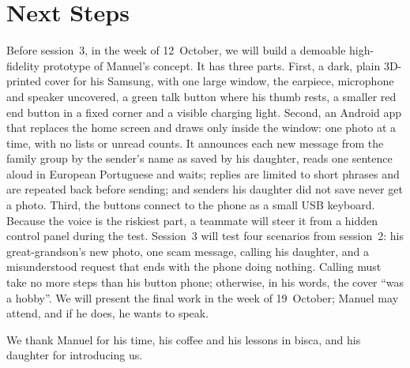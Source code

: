 \documentclass[acmtog,nonacm]{acmart}
\begin{document}
\section{Next Steps}\label{sec:next}
Before session~3, in the week of 12~October, we will build a demoable high-fidelity prototype of Manuel's concept. It has three parts. First, a dark, plain 3D-printed cover for his Samsung, with one large window, the earpiece, microphone and speaker uncovered, a green talk button where his thumb rests, a smaller red end button in a fixed corner and a visible charging light. Second, an Android app that replaces the home screen and draws only inside the window: one photo at a time, with no lists or unread counts. It announces each new message from the family group by the sender's name as saved by his daughter, reads one sentence aloud in European Portuguese and waits; replies are limited to short phrases and are repeated back before sending; and senders his daughter did not save never get a photo. Third, the buttons connect to the phone as a small USB keyboard. Because the voice is the riskiest part, a teammate will steer it from a hidden control panel during the test. Session~3 will test four scenarios from session~2: his great-grandson's new photo, one scam message, calling his daughter, and a misunderstood request that ends with the phone doing nothing. Calling must take no more steps than his button phone; otherwise, in his words, the cover ``was a hobby''. We will present the final work in the week of 19~October; Manuel may attend, and if he does, he wants to speak.

\begin{acks}
We thank Manuel for his time, his coffee and his lessons in bisca, and his daughter for introducing us.
\end{acks}



\end{document}
